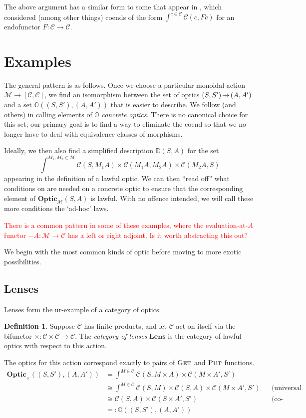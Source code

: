 \documentclass[11pt,a4paper]{article}
\theoremstyle{plain}
\theoremstyle{definition}
\newtheorem{definition}[theorem]{Definition}
\newcommand{\C}{\mathscr{C}}
\newcommand{\M}{\mathscr{M}}
\newcommand{\Optic}{\mathbf{Optic}}
\newcommand{\Lens}{\mathbf{Lens}}
\newcommand{\fget}{\textsc{Get}}
\newcommand{\fput}{\textsc{Put}}
\newcommand{\hto}{\ensuremath{\,\mathaccent\shortmid\rightarrow\,}}
\newcommand{\todo}[1]{\textcolor{red}{\small #1}}
\begin{document}
The above argument has a similar form to some that appear in \cite{OnTheTrace}, which considered (among other things) coends of the form $\int^{c \in \C} \C(c, Fc)$ for an endofunctor $F : \C \to \C$.

\section{Examples}
\label{lawful-examples}

The general pattern is as follows. Once we choose a particular monoidal action $\M \to [\C, \C]$, we find an isomorphism between the set of optics $(S, S') \hto (A, A')$ and a set $\mathbb{O}((S, S'), (A, A'))$ that is easier to describe. We follow \cite{ProfunctorOptics} (and others) in calling elements of $\mathbb{O}$ \emph{concrete optics}. There is no canonical choice for this set; our primary goal is to find a way to eliminate the coend so that we no longer have to deal with equivalence classes of morphisms.

Ideally, we then also find a simplified description $\mathbb{D}(S, A)$ for the set \[ \int^{M_1, M_2 \in \M} \C(S, M_1 A) \times \C(M_1 A, M_2 A) \times \C(M_2 A, S)\] appearing in the definition of a lawful optic. We can then ``read off'' what conditions on are needed on a concrete optic to ensure that the corresponding element of $\Optic_\M(S, A)$ is lawful. With no offence intended, we will call these more conditions the `ad-hoc' laws.

\todo{There is a common pattern in some of these examples, where the evaluation-at-$A$ functor $-A : \M \to \C$ has a left or right adjoint. Is it worth abstracting this out?}

We begin with the most common kinds of optic before moving to more exotic possibilities.

\subsection{Lenses}

Lenses form the ur-example of a category of optics.

\begin{definition}
  Suppose $\C$ has finite products, and let $\C$ act on itself via the bifunctor $\times : \C \times \C \to \C$. The \emph{category of lenses} $\Lens$ is the category of lawful optics with respect to this action.
\end{definition}

The optics for this action correspond exactly to pairs of $\fget$ and $\fput$ functions.
\begin{align*}
  \Optic_\times((S, S'), (A, A')) &= \int^{M \in \C} \C(S, M \times A) \times \C(M \times A', S') \\
                                  &\cong \int^{M \in \C} \C(S, M) \times \C(S, A) \times \C(M \times A', S') && \text{(universal property of product)} \\
                                  &\cong \C(S, A) \times \C(S \times A', S') && \text{(co-Yoneda)} \\
                                  &=: \mathbb{O}((S, S'), (A, A'))
\end{align*}
\end{document}
